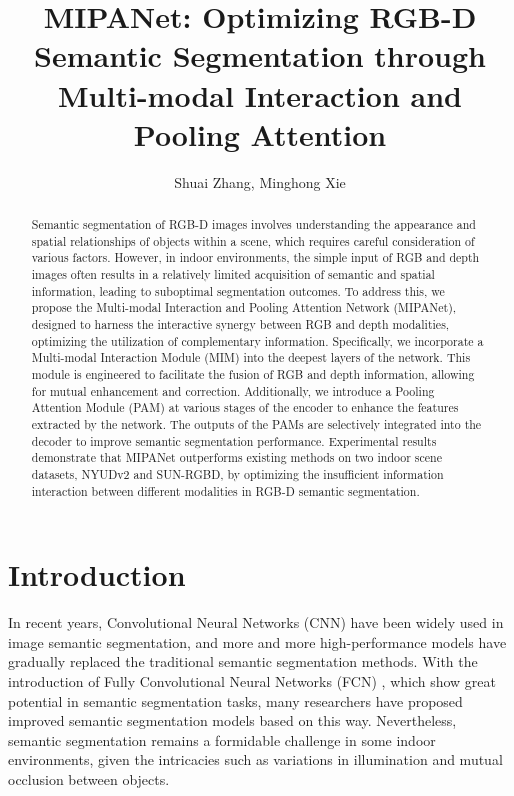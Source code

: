 \documentclass{aims}
\numberwithin{equation}{section}
\begin{document}
\title{MIPANet: Optimizing RGB-D Semantic Segmentation through Multi-modal Interaction and Pooling Attention}

\author{Shuai Zhang,
Minghong Xie\corrauth
}


\address{}


\begin{abstract}
Semantic segmentation of RGB-D images involves understanding the appearance and spatial relationships of objects within a scene, which requires careful consideration of various factors. However, in indoor environments, the simple input of RGB and depth images often results in a relatively limited acquisition of semantic and spatial information, leading to suboptimal segmentation outcomes. To address this, we propose the Multi-modal Interaction and Pooling Attention Network (MIPANet), designed to harness the interactive synergy between RGB and depth modalities, optimizing the utilization of complementary information.
Specifically, we incorporate a Multi-modal Interaction Module (MIM) into the deepest layers of the network. This module is engineered to facilitate the fusion of RGB and depth information, allowing for mutual enhancement and correction. Additionally, we introduce a Pooling Attention Module (PAM) at various stages of the encoder to enhance the features extracted by the network. The outputs of the PAMs are selectively integrated into the decoder to improve semantic segmentation performance. Experimental results demonstrate that MIPANet outperforms existing methods on two indoor scene datasets, NYUDv2 and SUN-RGBD, by optimizing the insufficient information interaction between different modalities in RGB-D semantic segmentation. 

\end{abstract}


\maketitle

\section{Introduction}
In recent years, Convolutional Neural Networks (CNN) have been widely used in image semantic segmentation, and more and more high-performance models have gradually replaced the traditional semantic segmentation methods. With the introduction of Fully Convolutional Neural Networks (FCN) \cite{long2015fully, li2022enhancing}, which show great potential in semantic segmentation tasks, many researchers have proposed improved semantic segmentation models based on this way. Nevertheless, semantic segmentation remains a formidable challenge in some indoor environments, given the intricacies such as variations in illumination and mutual occlusion between objects.
\end{document}
